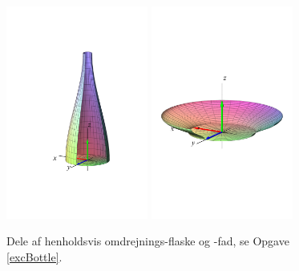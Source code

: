 \begin{figure}[h]
\centerline{\includegraphics[height=70mm]{FIGS/plotBottle1} \includegraphics[height=70mm]{FIGS/plotDish1}}
\begin{center}
\caption{\small{Dele af henholdsvis omdrejnings-flaske og -fad, se Opgave \ref{excBottle}.}}
\label{figBottle}
\end{center}
\end{figure}




